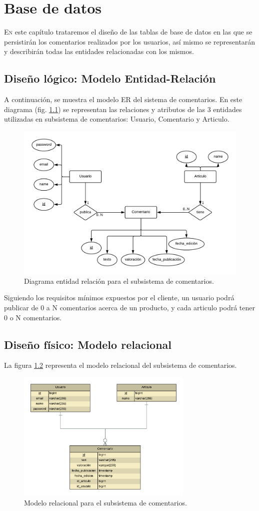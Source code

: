 \chapter{Base de datos}
\lettrine{E}{n} este capítulo trataremos el diseño de las tablas de base de datos en las que se persistirán los comentarios realizados por los usuarios, así mismo se representarán y describirán todas las entidades relacionadas con los mismos.

\section{Diseño lógico: Modelo Entidad-Relación}
A continuación, se muestra el modelo ER del sistema de comentarios. En este diagrama (fig. \ref{erDiag}) se representan las relaciones y atributos de las 3 entidades utilizadas en subsistema de comentarios: Usuario, Comentario y Articulo.

\begin{figure}[ht!]
	\centering
	\includegraphics[width=1\textwidth]{imaxes/er.png}
	\caption{Diagrama entidad relación para el subsistema de comentarios.}
	\label{erDiag}
\end{figure}

Siguiendo los requisitos mínimos expuestos por el cliente, un usuario podrá publicar de 0 a N comentarios acerca de un producto, y cada articulo podrá tener 0 o N comentarios.

\section{Diseño físico: Modelo relacional}

La figura \ref{erModel} representa el modelo relacional del subsistema de comentarios.

\begin{figure}[ht!]
	\centering
	\includegraphics[width=0.75\textwidth]{imaxes/ermodel.png}
	\caption{Modelo relacional para el subsistema de comentarios.}
	\label{erModel}
\end{figure}